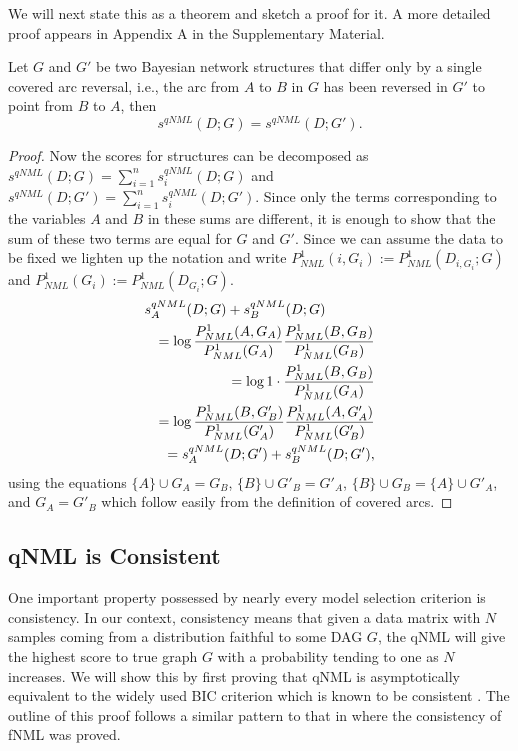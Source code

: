 We will next state this as a
theorem and sketch a proof for it. A more detailed proof appears in Appendix A in the Supplementary Material.
\begin{theorem}
  \label{thm:scoreqv}
  Let $G$ and $G'$ be two Bayesian network structures that differ only
  by a single covered arc reversal, i.e., the arc from $A$ to $B$ in $G$
  has been reversed in $G'$ to point from $B$ to $A$, then
  $$s^{qNML}(D;G)=s^{qNML}(D;G').$$
\end{theorem}
\begin{proof}
  Now the scores for structures can be decomposed as
  $s^{qNML}(D;G)=\sum_{i=1}^{n}s_i^{qNML}(D;G)$ and
  $s^{qNML}(D;G')=\sum_{i=1}^{n}s_i^{qNML}(D;G')$.  Since only the
  terms corresponding to the variables $A$ and $B$ in these sums are
  different, it is enough to show that the sum of these two terms are
  equal for $G$ and $G'$. Since we can assume the data to be fixed we
  lighten up the notation and write
  $P^1_{NML}(i,G_i) := P^1_{NML}(D_{i,G_i};G)$ and
  $P^1_{NML}(G_i)   := P^1_{NML}(D_{G_i};G)$.
  \begin{eqnarray}
    \lefteqn{s_A^{qNML}(D;G)+s_B^{qNML}(D;G)} \nonumber\\
    && =\log\frac{P^1_{NML}(A,G_{A})}{P^1_{NML}(G_{A})}
            \frac{P^1_{NML}(B,G_{B})}{P^1_{NML}(G_{B})}\nonumber\\
    && =\log 1\cdot\frac{P^1_{NML}(B,G_{B})}{P^1_{NML}(G_{A})}\nonumber\\
    && =\log \frac{P^1_{NML}(B,G'_{B})}{P^1_{NML}(G'_{A})}
             \frac{P^1_{NML}(A,G'_{A})}{P^1_{NML}(G'_{B})}\nonumber\\
 && =s_A^{qNML}(D;G')+s_B^{qNML}(D;G'),\nonumber
\end{eqnarray}
  using the equations $\{A\}\cup G_A = G_B$, $\{B\}\cup G'_B = G'_A$,
  $\{B\}\cup G_B = \{A\} \cup G'_A$, and $G_A = G'_B$ which follow
  easily from the definition of covered arcs.
\end{proof}

\subsection{qNML is Consistent}

One important property possessed by nearly every model selection
criterion is consistency. In our context, consistency means that given
a data matrix with $N$ samples coming from a distribution faithful to
some DAG $G$, the qNML will give the highest score to true graph $G$
with a probability tending to one as $N$ increases. We will show this
by first proving that qNML is asymptotically equivalent to the widely used
BIC criterion which is known to be consistent \cite{Schw78, Haug88}.
The outline of this proof follows a similar pattern to that in
\cite{SilanderIJAR10} where the consistency of fNML was proved.


